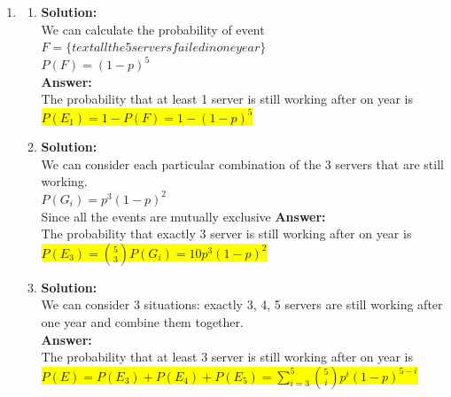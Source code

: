 \documentclass{article}
\newcommand{\myansw}{\textbf{Answer:}\\}
\newcommand{\mysolu}{\textbf{Solution:}\\}
\begin{document}
\begin{enumerate}
\begin{enumerate}
	\end{enumerate}
	\item
	\begin{enumerate}
		\item
		\mysolu
		We can calculate the probability of event ${F=\{text{all the 5 servers failed in one year}\}}$\\
		${P(F)=(1-p)^5}$\\
		\myansw
		The probability that at least 1 server is still working after on year is\\
		\colorbox{yellow}{${P(E_1)=1-P(F)=1-(1-p)^5}$}\\
		\item
		\mysolu
		We can consider each particular combination of the 3 servers that are still working.\\
		${P(G_i)=p^3(1-p)^2}$\\
		Since all the events are mutually exclusive
		\myansw
		The probability that exactly 3 server is still working after on year is\\
		\colorbox{yellow}{
			${P(E_3)={5 \choose 3}P(G_i)=10p^3(1-p)^2}$
		}\\
		\item
		\mysolu
		We can consider 3 situations: exactly 3, 4, 5 servers are still working after one year and combine them together.\\
		\myansw
		The probability that at least 3 server is still working after on year is\\
		\colorbox{yellow}{
			${P(E)=P(E_3)+P(E_4)+P(E_5)=\sum\limits_{i=3}^5 {5 \choose i}p^i(1-p)^{5-i}}$
		}\\
		

\end{enumerate}
\end{enumerate}
\end{document}
